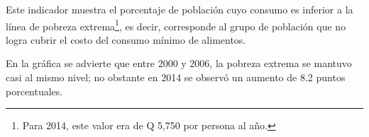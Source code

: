 Este indicador muestra el porcentaje de población cuyo consumo es inferior a la línea de pobreza extrema\footnote{Para 2014, este valor era de Q 5,750 por persona al año.}, es decir, corresponde al grupo de población que no logra cubrir el costo del consumo mínimo de alimentos. 
 
En la gráfica se advierte que entre 2000 y 2006,  la pobreza extrema se mantuvo casi  al mismo nivel; no obstante en  2014 se observó un aumento de 8.2 puntos porcentuales.